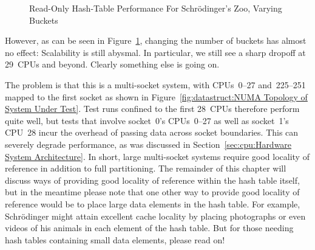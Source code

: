 \begin{figure}[tb]
\centering
{}
\caption{Read-Only Hash-Table Performance For Schr\"odinger's Zoo, Varying Buckets}
\label{fig:datastruct:Read-Only Hash-Table Performance For Schroedinger's Zoo, Varying Buckets}
\end{figure}

However, as can be seen in
Figure~\ref{fig:datastruct:Read-Only Hash-Table Performance For Schroedinger's Zoo, Varying Buckets},
changing the number of buckets has almost no effect:
Scalability is still abysmal.
In particular, we still see a sharp dropoff at 29~CPUs and beyond.
Clearly something else is going on.

The problem is that this is a multi-socket system, with CPUs~0--27
and~225--251 mapped to the first socket as shown in
Figure~\ref{fig:datastruct:NUMA Topology of System Under Test}.
Test runs confined to the first 28~CPUs therefore perform quite
well, but tests that involve socket~0's CPUs~0--27 as well as
socket~1's CPU~28 incur the overhead of passing data across
socket boundaries.
This can severely degrade performance, as was discussed in
Section~\ref{sec:cpu:Hardware System Architecture}.
In short, large multi-socket systems require good locality of reference
in addition to full partitioning.
The remainder of this chapter will discuss ways of providing good
locality of reference within the hash table itself, but in the
meantime please note that one other way to provide good locality
of reference would be to place large data elements in the hash
table.
For example, Schr\"odinger might attain excellent cache locality by
placing photographs or even videos of his animals in each element of
the hash table.
But for those needing hash tables containing small data elements,
please read on!

